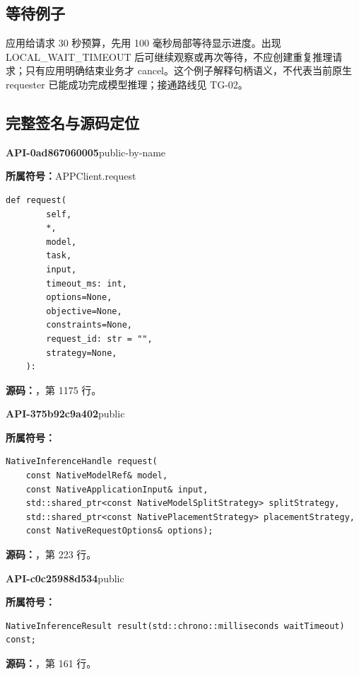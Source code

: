 \subsection{等待例子}
应用给请求 30 秒预算，先用 100 毫秒局部等待显示进度。出现 LOCAL\_WAIT\_TIMEOUT 后可继续观察或再次等待，不应创建重复推理请求；只有应用明确结束业务才 cancel。这个例子解释句柄语义，不代表当前原生 requester 已能成功完成模型推理；接通路线见 TG-02。

\subsection{完整签名与源码定位}

\textbf{API-0ad867060005}\quad public-by-name\par
\textbf{所属符号：}APPClient.request\par
\begin{Verbatim}[fontsize=\footnotesize,breaklines,breakanywhere]
def request(
        self,
        *,
        model,
        task,
        input,
        timeout_ms: int,
        options=None,
        objective=None,
        constraints=None,
        request_id: str = "",
        strategy=None,
    ):
\end{Verbatim}
\textbf{源码：}，第 1175 行。\par

\textbf{API-375b92c9a402}\quad public\par
\textbf{所属符号：}\par
\begin{Verbatim}[fontsize=\footnotesize,breaklines,breakanywhere]
NativeInferenceHandle request(
    const NativeModelRef& model,
    const NativeApplicationInput& input,
    std::shared_ptr<const NativeModelSplitStrategy> splitStrategy,
    std::shared_ptr<const NativePlacementStrategy> placementStrategy,
    const NativeRequestOptions& options);
\end{Verbatim}
\textbf{源码：}，第 223 行。\par

\textbf{API-c0c25988d534}\quad public\par
\textbf{所属符号：}\par
\begin{Verbatim}[fontsize=\footnotesize,breaklines,breakanywhere]
NativeInferenceResult result(std::chrono::milliseconds waitTimeout) const;
\end{Verbatim}
\textbf{源码：}，第 161 行。\par

